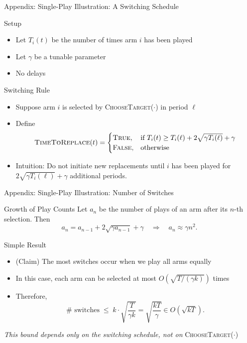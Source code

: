 \documentclass[10pt,aspectratio=169]{beamer}
\begin{document}
\begin{frame}{Appendix: Single-Play Illustration: A Switching Schedule}
    \begin{block}{Setup}
    \begin{itemize}
        \item Let \(T_i(t)\) be the number of times arm \(i\) has been played
        \item Let \(\gamma\) be a tunable parameter
        \item No delays
    \end{itemize}
    \end{block}
    
    \begin{block}{Switching Rule}
    \begin{itemize}
        \item Suppose arm \(i\) is selected by \textsc{ChooseTarget}(\(\cdot\)) in period \(\ell\)
        \item Define
        \[
            \textsc{TimeToReplace}(t)=\begin{cases}
                \textsc{True}, &\text{if } T_i(t)\geq T_i(\ell)+2\sqrt{\gamma T_i(\ell)} + \gamma\\
                \textsc{False}, &\text{otherwise}
            \end{cases}
        \]
        \item Intuition: Do not initiate new replacements until \(i\) has been played for \(2\sqrt{\gamma T_i(\ell)} + \gamma\) additional periods.
    \end{itemize}
    \end{block}
\end{frame}

\begin{frame}{Appendix: Single-Play Illustration: Number of Switches}
    \begin{block}{Growth of Play Counts}
    Let \(a_n\) be the number of plays of an arm after its \(n\)-th selection. Then
    \[
    a_n = a_{n-1} + 2\sqrt{\gamma a_{n-1}} + \gamma \quad \Rightarrow \quad a_n \approx \gamma n^2.
    \]
    \end{block}
    
    \vspace{0.5em}
    
    \begin{block}{Simple Result}
    \begin{itemize}
        \item (Claim) The most switches occur when we play all arms equally
        \item In this case, each arm can be selected at most \(O\left(\sqrt{T/(\gamma k)}\right)\) times
        \item Therefore,
        \[
        \#\text{ switches} \;\le\; k \cdot \sqrt{\frac{T}{\gamma k}} = \sqrt{\frac{kT}{\gamma}}\in O(\sqrt{kT}).
        \]
    \end{itemize}
    \end{block}
    \begin{center}
    \emph{This bound depends only on the switching schedule, not on} \textsc{ChooseTarget}(\(\cdot\))
    \end{center}
\end{frame}
\end{document}
